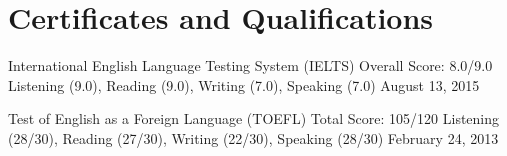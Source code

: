 \section*{Certificates and Qualifications}

\certificate
	{International English Language Testing System (IELTS)}
	{Overall Score: 8.0/9.0}
	{Listening (9.0), Reading (9.0), Writing (7.0), Speaking (7.0)}
	{August 13, 2015}

\certificate
	{Test of English as a Foreign Language (TOEFL)}
	{Total Score: 105/120}
	{Listening (28/30), Reading (27/30), Writing (22/30), Speaking (28/30)}
	{February 24, 2013}
